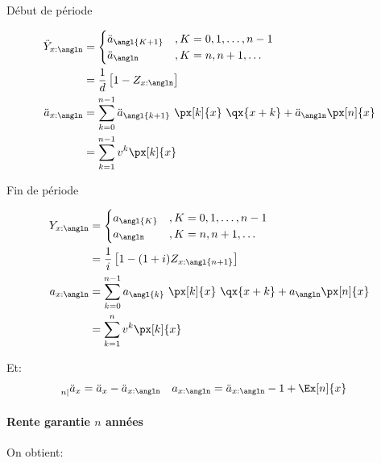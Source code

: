 \documentclass[10pt, french]{article}
\begin{document}
\begin{multicols*}{3}
\begin{minipage}[t]{0.5\columnwidth}
\begin{center}
Début de période
\end{center}
\begin{align*}
	\ddot{Y}_{x:\angln} 
	&= 	\begin{cases}
			\ddot{a}_{\angl{K + 1}}	& , K = 0, 1, \dots, n - 1 \\
			\ddot{a}_{\angln}		& , K = n, n + 1, \dots \\
		\end{cases} \\
	&=	\frac{1}{d} \left[ 1 - Z_{x:\angln} \right]	\\
	\ddot{a}_{x:\angln}	
	&=	\sum_{k = 0}^{n - 1} \ddot{a}_{\angl{k + 1}} \ \px[k]{x} \ \qx{x + k}	+	\ddot{a}_{\angln} \px[n]{x}	\\
	&=	\sum_{k = 1}^{n - 1} v^{k} \px[k]{x}
\end{align*}
\end{minipage}
\begin{minipage}[t]{0.5\columnwidth}
\begin{center}
Fin de période
\end{center}
\begin{align*}
	Y_{x:\angln} 
	&= 	\begin{cases}
			a_{\angl{K}}	& , K = 0, 1, \dots, n - 1 \\
			a_{\angln}	& , K = n, n + 1, \dots \\
		\end{cases} \\
	&=	\frac{1}{i}\left[ 1 - (1 + i) Z_{x:\angl{n + 1}}\right] 	\\
	a_{x:\angln}	
	&=	\sum_{k = 0}^{n - 1} a_{\angl{k}} \ \px[k]{x} \ \qx{x + k}	+	a_{\angln} \px[n]{x}	\\
	&=	\sum_{k = 1}^{n} v^{k} \px[k]{x}
\end{align*}	
\end{minipage}
\setlength{\mathindent}{1cm}

Et:
\begin{align*}
	\prescript{}{n|}{\ddot{a}_{x}}
	&=	\ddot{a}_{x} - \ddot{a}_{x:\angln}	&
	a_{x:\angln}
	&=	\ddot{a}_{x:\angln} - 1 + \Ex[n]{x}
\end{align*}

\paragraph{Rente garantie $n$ années}
On obtient:


\end{multicols*}
\end{document}
